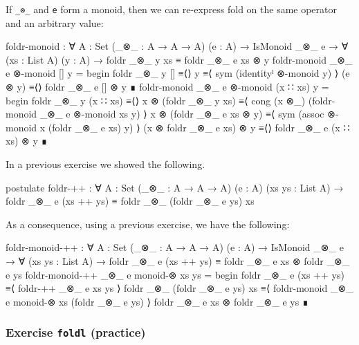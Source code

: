 If \texttt{\_⊗\_} and \texttt{e} form a monoid, then we can re-express
fold on the same operator and an arbitrary value:

\begin{fence}
\begin{code}
foldr-monoid : ∀ {A : Set} (_⊗_ : A → A → A) (e : A) → IsMonoid _⊗_ e →
  ∀ (xs : List A) (y : A) → foldr _⊗_ y xs ≡ foldr _⊗_ e xs ⊗ y
foldr-monoid _⊗_ e ⊗-monoid [] y =
  begin
    foldr _⊗_ y []
  ≡⟨⟩
    y
  ≡⟨ sym (identityˡ ⊗-monoid y) ⟩
    (e ⊗ y)
  ≡⟨⟩
    foldr _⊗_ e [] ⊗ y
  ∎
foldr-monoid _⊗_ e ⊗-monoid (x ∷ xs) y =
  begin
    foldr _⊗_ y (x ∷ xs)
  ≡⟨⟩
    x ⊗ (foldr _⊗_ y xs)
  ≡⟨ cong (x ⊗_) (foldr-monoid _⊗_ e ⊗-monoid xs y) ⟩
    x ⊗ (foldr _⊗_ e xs ⊗ y)
  ≡⟨ sym (assoc ⊗-monoid x (foldr _⊗_ e xs) y) ⟩
    (x ⊗ foldr _⊗_ e xs) ⊗ y
  ≡⟨⟩
    foldr _⊗_ e (x ∷ xs) ⊗ y
  ∎
\end{code}
\end{fence}

In a previous exercise we showed the following.

\begin{fence}
\begin{code}
postulate
  foldr-++ : ∀ {A : Set} (_⊗_ : A → A → A) (e : A) (xs ys : List A) →
    foldr _⊗_ e (xs ++ ys) ≡ foldr _⊗_ (foldr _⊗_ e ys) xs
\end{code}
\end{fence}

As a consequence, using a previous exercise, we have the following:

\begin{fence}
\begin{code}
foldr-monoid-++ : ∀ {A : Set} (_⊗_ : A → A → A) (e : A) → IsMonoid _⊗_ e →
  ∀ (xs ys : List A) → foldr _⊗_ e (xs ++ ys) ≡ foldr _⊗_ e xs ⊗ foldr _⊗_ e ys
foldr-monoid-++ _⊗_ e monoid-⊗ xs ys =
  begin
    foldr _⊗_ e (xs ++ ys)
  ≡⟨ foldr-++ _⊗_ e xs ys ⟩
    foldr _⊗_ (foldr _⊗_ e ys) xs
  ≡⟨ foldr-monoid _⊗_ e monoid-⊗ xs (foldr _⊗_ e ys) ⟩
    foldr _⊗_ e xs ⊗ foldr _⊗_ e ys
  ∎
\end{code}
\end{fence}

\hypertarget{exercise-foldl-practice}{%
\subsubsection{\texorpdfstring{Exercise \texttt{foldl}
(practice)}{Exercise foldl (practice)}}\label{exercise-foldl-practice}}

